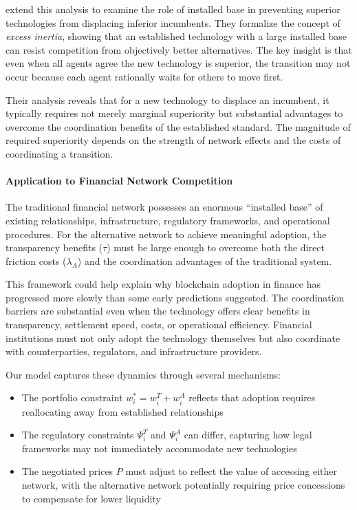  extend this analysis to examine the role of installed base in preventing superior technologies from displacing inferior incumbents. They formalize the concept of \textit{excess inertia}, showing that an established technology with a large installed base can resist competition from objectively better alternatives. The key insight is that even when all agents agree the new technology is superior, the transition may not occur because each agent rationally waits for others to move first.

Their analysis reveals that for a new technology to displace an incumbent, it typically requires not merely marginal superiority but substantial advantages to overcome the coordination benefits of the established standard. The magnitude of required superiority depends on the strength of network effects and the costs of coordinating a transition.

\paragraph{Application to Financial Network Competition}

The traditional financial network possesses an enormous ``installed base'' of existing relationships, infrastructure, regulatory frameworks, and operational procedures. For the alternative network to achieve meaningful adoption, the transparency benefits ($\tau$) must be large enough to overcome both the direct friction costs ($\lambda_A$) and the coordination advantages of the traditional system.

This framework could help explain why blockchain adoption in finance has progressed more slowly than some early predictions suggested. The coordination barriers are substantial even when the technology offers clear benefits in transparency, settlement speed, costs, or operational efficiency. Financial institutions must not only adopt the technology themselves but also coordinate with counterparties, regulators, and infrastructure providers.

Our model captures these dynamics through several mechanisms:

\begin{itemize}
    \item The portfolio constraint $w_i^* = w_i^T + w_i^A$ reflects that adoption requires reallocating away from established relationships
    \item The regulatory constraints $\Psi_i^T$ and $\Psi_i^A$ can differ, capturing how legal frameworks may not immediately accommodate new technologies
    \item The negotiated prices $P$ must adjust to reflect the value of accessing either network, with the alternative network potentially requiring price concessions to compensate for lower liquidity
\end{itemize}

